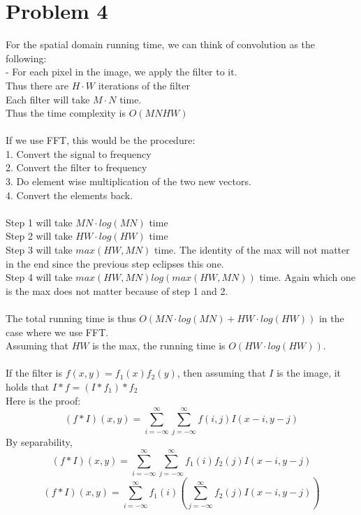 \documentclass[11pt,psfig]{article}
\begin{document}
\newpage

\section*{Problem 4}

For the spatial domain running time, we can think of convolution as the following:\\
- For each pixel in the image, we apply the filter to it. \\
Thus there are $H \cdot W$ iterations of the filter\\
Each filter will take $M \cdot N$ time. \\
Thus the time complexity is $O(MNHW)$\\
\\
If we use FFT, this would be the procedure:\\
1. Convert the signal to frequency\\
2. Convert the filter to frequency \\
3. Do element wise multiplication of the two new vectors. \\
4. Convert the elements back. \\
\\
Step 1 will take $MN \cdot log(MN)$ time\\
Step 2 will take $HW \cdot log(HW)$ time\\
Step 3 will take $max(HW,MN)$ time. The identity of the max will not matter in the end since the previous step eclipses this one. \\
Step 4 will take $max(HW,MN) log( max(HW, MN) )$ time. Again which one is the max does not matter because of step 1 and 2. \\
\\
The total running time is thus $O(MN \cdot log(MN) + HW \cdot log(HW) )$ in the case where we use FFT. \\
Assuming that $HW$ is the max, the running time is $O(HW \cdot log(HW))$. \\
\\
If the filter is $f(x,y) = f_1(x)f_2(y)$, then assuming that $I$ is the image, it holds that $I*f = (I*f_1)*f_2$\\
Here is the proof:\\
\[
(f*I)(x,y) = \sum_{i=-\infty}^{\infty} \sum_{j=-\infty}^{\infty} f(i,j)I(x-i,y-j)
\]
By separability,
\[
(f*I)(x,y) = \sum_{i=-\infty}^{\infty} \sum_{j=-\infty}^{\infty} f_1(i)f_2(j)I(x-i,y-j)
\]
\[
(f*I)(x,y) = \sum_{i=-\infty}^{\infty} f_1(i) (\sum_{j=-\infty}^{\infty} f_2(j)I(x-i,y-j))
\]
\end{document}
